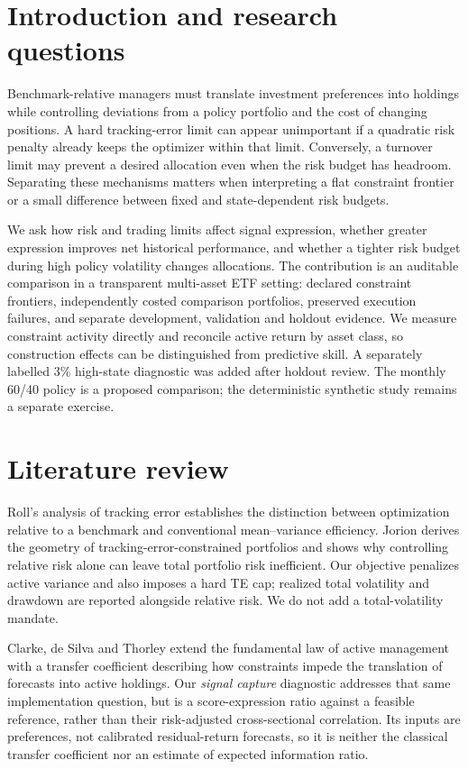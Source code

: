 \documentclass[11pt,a4paper]{article}
\begin{document}
\section{Introduction and research questions}
Benchmark-relative managers must translate investment preferences into holdings
while controlling deviations from a policy portfolio and the cost of changing
positions. A hard tracking-error limit can appear unimportant if a quadratic risk
penalty already keeps the optimizer within that limit. Conversely, a turnover
limit may prevent a desired allocation even when the risk budget has headroom.
Separating these mechanisms matters when interpreting a flat constraint frontier
or a small difference between fixed and state-dependent risk budgets.

We ask how risk and trading limits affect signal expression, whether greater
expression improves net historical performance, and whether a tighter risk budget
during high policy volatility changes allocations. The contribution is an
auditable comparison in a transparent multi-asset ETF setting: declared
constraint frontiers, independently costed comparison portfolios, preserved
execution failures, and separate development, validation and holdout evidence.
We measure constraint activity directly and reconcile active return by asset
class, so construction effects can be distinguished from predictive skill.
A separately labelled 3\% high-state diagnostic was added after holdout review.
The monthly 60/40 policy is a proposed comparison; the deterministic synthetic
study remains a separate exercise.
\section{Literature review}
Roll's analysis of tracking error \cite{roll} establishes the distinction between
optimization relative to a benchmark and conventional mean--variance efficiency.
Jorion \cite{jorion} derives the geometry of tracking-error-constrained portfolios
and shows why controlling relative risk alone can leave total portfolio risk
inefficient. Our objective penalizes active variance and also imposes a hard TE
cap; realized total volatility and drawdown are reported alongside relative risk.
We do not add a total-volatility mandate.

Clarke, de Silva and Thorley \cite{cdt} extend the fundamental law of active
management with a transfer coefficient describing how constraints impede the
translation of forecasts into active holdings. Our \textit{signal capture} diagnostic
addresses that same implementation question, but is a score-expression ratio
against a feasible reference, rather than their risk-adjusted cross-sectional
correlation. Its inputs are preferences, not calibrated residual-return forecasts,
so it is neither the classical transfer coefficient nor an estimate of expected
information ratio.
\end{document}
